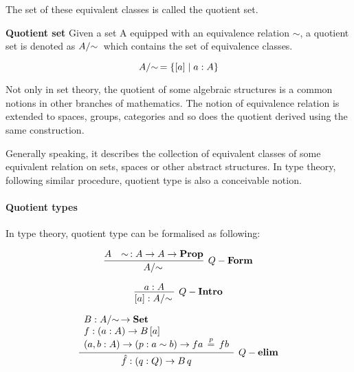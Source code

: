 The set of these equivalent classes is called
the quotient set.

\begin{definition}

\textbf{Quotient set} Given a set A equipped with an equivalence relation $\sim$, a quotient
set is denoted as $\qset{A}$ which contains the set of equivalence
classes.

\begin{equation}
\qset{A} = \{ [ a ] \;|\; a : A \}
\end{equation}

\end{definition}

Not only in set theory, the quotient of some algebraic structures is
a common notions in other branches of mathematics. The notion of
equivalence relation is extended to spaces, groups, categories and so
does the quotient derived using the same construction. 

Generally
speaking, it describes the collection of equivalent classes of some equivalent relation on sets, spaces or other abstract structures. In type theory, following similar procedure, quotient type is also a conceivable notion.


\paragraph{Quotient types}


In type theory, quotient type can be formalised as following:


\begin{equation*}
\infer[Q-\bf{Form}]{\qset{A}}{A & \sim\, : A \rightarrow A \rightarrow \bf{Prop}}
\end{equation*}

\begin{equation*}
\infer[Q-\bf{Intro}]{[ a ] : \qset{A}}{a : A}
\end{equation*}

\begin{equation*}
\infer[Q-\bf{elim}]{\hat{f} : (q : Q) \rightarrow B \, q}{
\begin{array}{l}
B : \qset{A} \rightarrow  \bf{Set}\\
f : (a : A) \rightarrow B\, [ a ]\\
(a, b : A)  \rightarrow (p : a \sim b)  \rightarrow f a  \, \stackrel{p}{=} \, f b\\
\end{array}}
\end{equation*}
 
